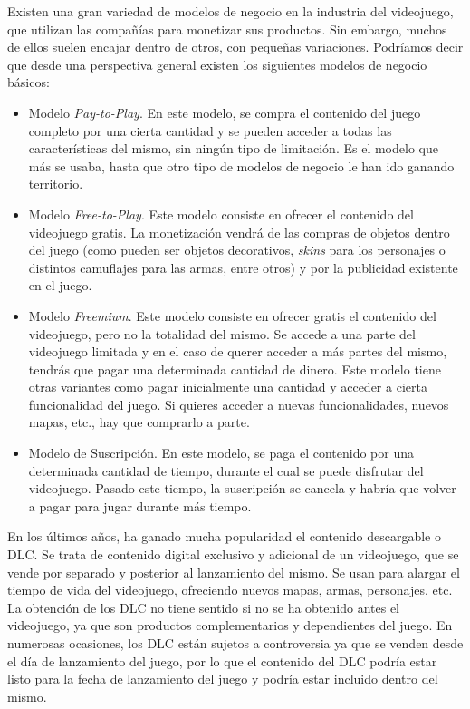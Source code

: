 Existen una gran variedad de modelos de negocio en la industria del videojuego, que utilizan las compañías para monetizar sus productos. Sin embargo, muchos de ellos suelen encajar dentro de otros, con pequeñas variaciones. Podríamos decir que desde una perspectiva general existen los siguientes modelos de negocio básicos:

\begin{itemize}
\item Modelo \textit{Pay-to-Play}. En este modelo, se compra el contenido del juego completo por una cierta cantidad y se pueden acceder a todas las características del mismo, sin ningún tipo de limitación. Es el modelo que más se usaba, hasta que otro tipo de modelos de negocio le han ido ganando territorio.
\item Modelo \textit{Free-to-Play}. Este modelo consiste en ofrecer el contenido del videojuego gratis. La monetización vendrá de las compras de objetos dentro del juego (como pueden ser objetos decorativos, \textit{skins} para los personajes o distintos camuflajes para las armas, entre otros) y por la publicidad existente en el juego.
\item Modelo \textit{Freemium}. Este modelo consiste en ofrecer gratis el contenido del videojuego, pero no la totalidad del mismo. Se accede a una parte del videojuego limitada y en el caso de querer acceder a más partes del mismo, tendrás que pagar una determinada cantidad de dinero. Este modelo tiene otras variantes como pagar inicialmente una cantidad y acceder a cierta funcionalidad del juego. Si quieres acceder a nuevas funcionalidades, nuevos mapas, etc., hay que comprarlo a parte.
\item Modelo de Suscripción. En este modelo, se paga el contenido por una determinada cantidad de tiempo, durante el cual se puede disfrutar del videojuego. Pasado este tiempo, la suscripción se cancela y habría que volver a pagar para jugar durante más tiempo.
\end{itemize}

En los últimos años, ha ganado mucha popularidad el contenido descargable o \ac{DLC}. Se trata de contenido digital exclusivo y adicional de un videojuego, que se vende por separado y posterior al lanzamiento del mismo. Se usan para alargar el tiempo de vida del videojuego, ofreciendo nuevos mapas, armas, personajes, etc. La obtención de los \ac{DLC} no tiene sentido si no se ha obtenido antes el videojuego, ya que son productos complementarios y dependientes del juego. En numerosas ocasiones, los \ac{DLC} están sujetos a controversia ya que se venden desde el día de lanzamiento del juego, por lo que el contenido del \ac{DLC} podría estar listo para la fecha de lanzamiento del juego y podría estar incluido dentro del mismo.

